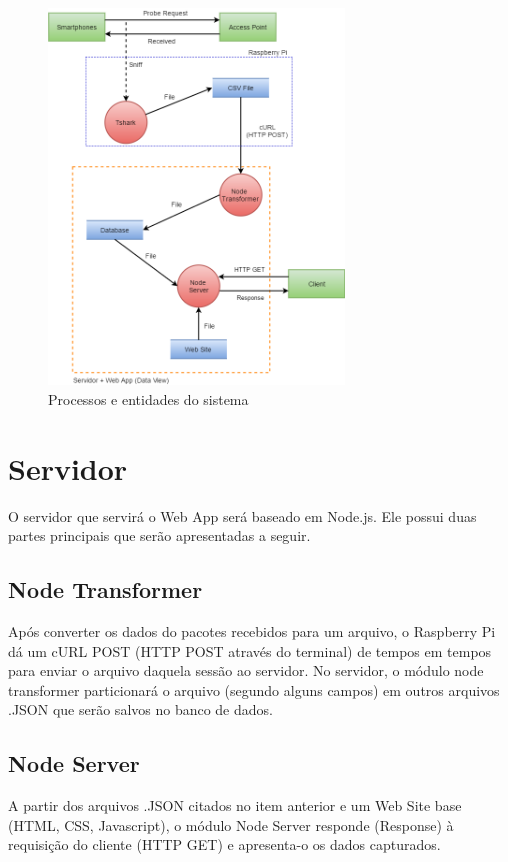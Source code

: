 \begin{figure}[!h]
  \caption{\label{diagrama-fluxo}Processos e entidades do sistema}
  \begin{center}
    \includegraphics[width=0.70\textwidth]{img/diagrama_fluxo.png}
  \end{center}
\end{figure}


\section{Servidor}
O servidor que servirá o Web App será baseado em Node.js. Ele possui duas partes principais que serão apresentadas a seguir.

\subsection{Node Transformer}
\label{node-transformer}
Após converter os dados do pacotes recebidos para um arquivo, o
Raspberry Pi dá um cURL POST (HTTP POST através do terminal) de tempos em tempos
para enviar o arquivo daquela sessão ao servidor. No servidor, o módulo
node transformer particionará o arquivo (segundo alguns campos) em outros
arquivos .JSON que serão salvos no banco de dados.

\subsection{Node Server}
 A partir dos arquivos .JSON citados no item anterior e um Web Site base (HTML,
 CSS, Javascript), o módulo Node Server responde (Response) à requisição do
 cliente (HTTP GET) e apresenta-o os dados capturados.

